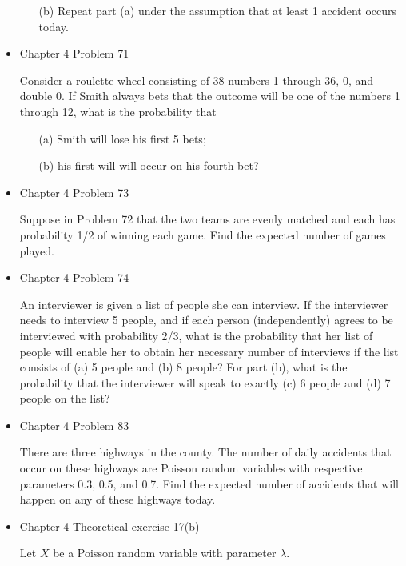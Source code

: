 \documentclass[11pt]{article}
\begin{document}
\begin{itemize}
\begin{itemize}
    \item[(b)] Repeat part (a) under the assumption that at least 1 accident occurs today.
    \end{itemize}

    \item
    Chapter 4 Problem  71
    
    Consider a roulette wheel consisting of 38 numbers 1 through 36, 0, and double 0. If Smith always bets that the outcome will be one of the numbers 1 through 12, what is the probability that
    
    \begin{itemize}
    \item[(a)] Smith will lose his first 5 bets;
    
    \item[(b)] his first will will occur on his fourth bet?
    \end{itemize}

    \item
    Chapter 4 Problem  73
    
    Suppose in Problem 72 that the two teams are evenly matched and each has probability 1/2 of winning each game. Find the expected number of games played.

    \item
    Chapter 4 Problem  74
    
    An interviewer is given a list of people she can interview. If the interviewer needs to interview 5 people, and if each person (independently) agrees to be interviewed with probability 2/3, what is the probability that her list of people will enable her to obtain her necessary number of interviews if the list consists of (a) 5 people and (b) 8 people? For part (b), what is the probability that the interviewer will speak to exactly (c) 6 people and (d) 7 people on the list?

    \item
    Chapter 4 Problem  83
    
    There are three highways in the county. The number of daily accidents that occur on these highways are Poisson random variables with respective parameters 0.3, 0.5, and 0.7. Find the expected number of accidents that will happen on any of these highways today.


   
    \item
    Chapter 4 Theoretical exercise 17(b)
    
    Let $X$ be a Poisson random variable with parameter $\lambda$.
    

\end{itemize}
\end{document}
